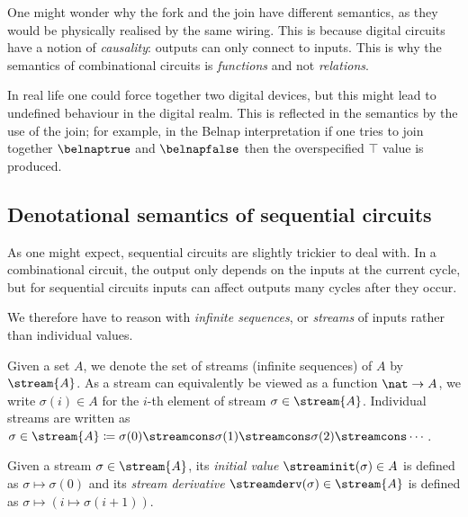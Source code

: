 \begin{remark}
    One might wonder why the fork and the join have different semantics, as they
    would be physically realised by the same wiring.
    This is because digital circuits have a notion of \emph{causality}: outputs
    can only connect to inputs.
    This is why the semantics of combinational circuits is \emph{functions} and
    not \emph{relations}.

    In real life one could force together two digital devices, but this might
    lead to undefined behaviour in the digital realm.
    This is reflected in the semantics by the use of the join; for example, in
    the Belnap interpretation if one tries to join together \(\belnaptrue\) and
    \(\belnapfalse\) then the overspecified \(\top\) value is produced.
\end{remark}

\subsection{Denotational semantics of sequential circuits}

As one might expect, sequential circuits are slightly trickier to deal with.
In a combinational circuit, the output only depends on the inputs at the current
cycle, but for sequential circuits inputs can affect outputs many cycles after
they occur.

We therefore have to reason with \emph{infinite sequences}, or \emph{streams} of
inputs rather than individual values.

\begin{notation}
    Given a set \(A\), we denote the set of streams (infinite sequences) of
    \(A\) by \(\stream{A}\).
    As a stream can equivalently be viewed as a function \(\nat \to A\), we
    write \(\sigma(i) \in A\) for the \(i\)-th element of stream
    \(\sigma \in \stream{A}\).
    Individual streams are written as \(
    \sigma \in \stream{A}
    \coloneqq
    \sigma(0) \streamcons \sigma(1) \streamcons
    \sigma(2) \streamcons \cdots
    \).
\end{notation}

\begin{definition}\label{def:stream-operations}
    Given a stream \(\sigma \in \stream{A}\), its \emph{initial value}
    \(\streaminit(\sigma) \in A\) is defined as \(\sigma \mapsto \sigma(0)\)
    and its \emph{stream derivative} \(\streamderv(\sigma) \in \stream{A}\) is
    defined as \(\sigma \mapsto (i \mapsto \sigma(i+1))\).
\end{definition}

